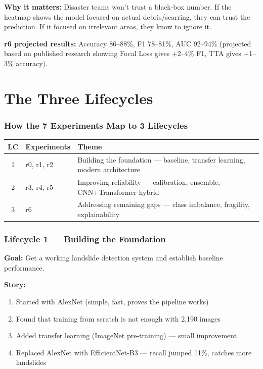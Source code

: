 \documentclass[11pt]{article}
\begin{document}
\textbf{Why it matters:} Disaster teams won't trust a black-box number. If the heatmap shows the model focused on actual debris/scarring, they can trust the prediction. If it focused on irrelevant areas, they know to ignore it.

\textbf{r6 projected results:} Accuracy 86--88\%, F1 78--81\%, AUC 92--94\% (projected based on published research showing Focal Loss gives +2--4\% F1, TTA gives +1--3\% accuracy).

\part{The Three Lifecycles}

\section{How the 7 Experiments Map to 3 Lifecycles}

\begin{table}[H]
    \centering
    \renewcommand{\arraystretch}{1.3}
    \begin{tabular}{clp{9cm}}
        \toprule
        \textbf{LC} & \textbf{Experiments} & \textbf{Theme} \\
        \midrule
        1 & r0, r1, r2 & Building the foundation --- baseline, transfer learning, modern architecture \\
        2 & r3, r4, r5 & Improving reliability --- calibration, ensemble, CNN+Transformer hybrid \\
        3 & r6 & Addressing remaining gaps --- class imbalance, fragility, explainability \\
        \bottomrule
    \end{tabular}
\end{table}

\section{Lifecycle 1 --- Building the Foundation}

\textbf{Goal:} Get a working landslide detection system and establish baseline performance.

\textbf{Story:}
\begin{enumerate}[noitemsep]
    \item Started with AlexNet (simple, fast, proves the pipeline works)
    \item Found that training from scratch is not enough with 2,190 images
    \item Added transfer learning (ImageNet pre-training) --- small improvement
    \item Replaced AlexNet with EfficientNet-B3 --- recall jumped 11\%, catches more landslides
\end{enumerate}
\end{document}
